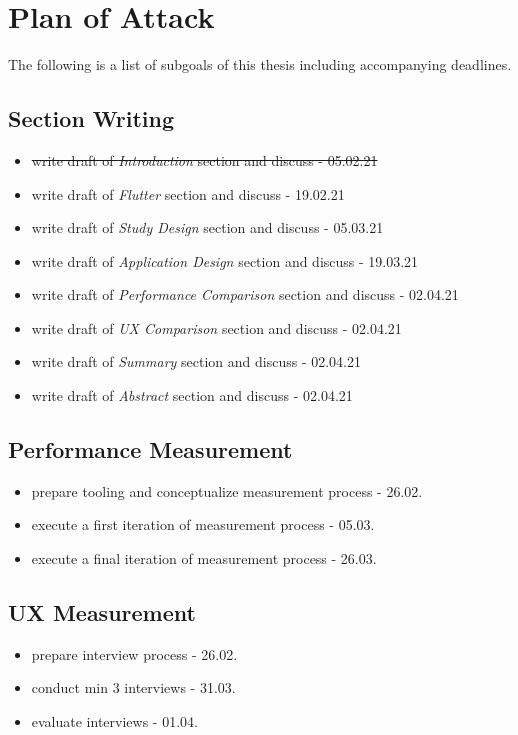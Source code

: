 \section{Plan of Attack}
\label{section:planofattack}
The following is a list of subgoals of this thesis including accompanying deadlines.

\subsection{Section Writing}
\begin{itemize}
    \item \sout{write draft of \textit{Introduction} section and discuss - 05.02.21}
    \item write draft of \textit{Flutter} section and discuss - 19.02.21
    \item write draft of \textit{Study Design} section and discuss - 05.03.21
    \item write draft of \textit{Application Design} section and discuss - 19.03.21
    \item write draft of \textit{Performance Comparison} section and discuss - 02.04.21
    \item write draft of \textit{UX Comparison} section and discuss - 02.04.21
    \item write draft of \textit{Summary} section and discuss - 02.04.21
    \item write draft of \textit{Abstract} section and discuss - 02.04.21
\end{itemize}


\subsection{Performance Measurement}
\begin{itemize}
    \item prepare tooling and conceptualize measurement process - 26.02.
    \item execute a first iteration of measurement process - 05.03.
    \item execute a final iteration of measurement process - 26.03.
\end{itemize}

\subsection{UX Measurement}
\begin{itemize}
    \item prepare interview process - 26.02.
    \item conduct min 3 interviews - 31.03.
    \item evaluate interviews - 01.04.
\end{itemize}

